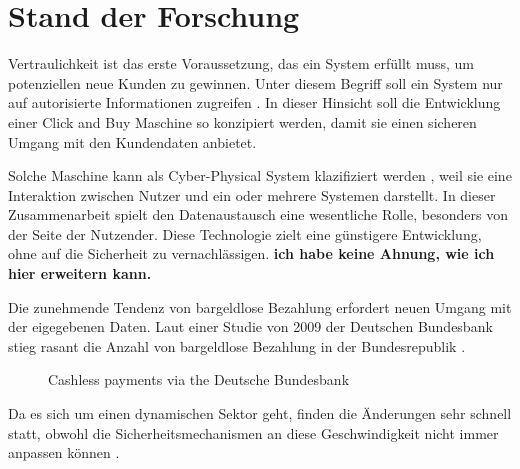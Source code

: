 \section{Stand der Forschung}

Vertraulichkeit ist das erste Voraussetzung, das ein System erfüllt muss, um  potenziellen neue 
Kunden zu gewinnen. Unter diesem Begriff soll ein System nur auf autorisierte Informationen 
zugreifen \cite{refbook:SWIS}. In dieser Hinsicht soll die Entwicklung einer Click and Buy Maschine 
so konzipiert werden, damit sie einen sicheren Umgang mit den Kundendaten anbietet.


Solche Maschine kann als Cyber-Physical System klazifiziert werden \cite{inbook:MHNS}, weil sie 
eine Interaktion zwischen Nutzer und ein oder mehrere Systemen darstellt. In dieser Zusammenarbeit
spielt den Datenaustausch eine wesentliche Rolle, besonders von der Seite der Nutzender. 
Diese Technologie zielt eine günstigere Entwicklung, ohne auf die Sicherheit zu vernachlässigen.
\textbf{ich habe keine Ahnung, wie ich hier erweitern kann.}


Die zunehmende Tendenz von bargeldlose Bezahlung erfordert neuen Umgang mit der eigegebenen Daten.
Laut einer Studie von 2009 der Deutschen Bundesbank stieg rasant die Anzahl von bargeldlose Bezahlung 
in der Bundesrepublik \cite{refrep:DB}.

\begin{figure}[htb]
    \caption{Cashless payments via the Deutsche Bundesbank}
    \label{fig:graphic}
\end{figure}

Da es sich um einen dynamischen Sektor geht, finden die Änderungen sehr schnell statt, obwohl die 
Sicherheitsmechanismen an diese Geschwindigkeit nicht immer anpassen können \cite{refbook:MNIT}.



